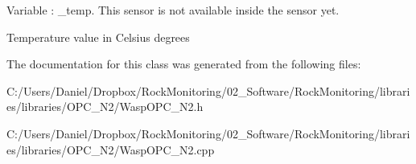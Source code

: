 Variable \+: \+\_\+temp. This sensor is not available inside the sensor yet. 

Temperature value in Celsius degrees 

The documentation for this class was generated from the following files\+:\begin{DoxyCompactItemize}
\item 
C\+:/\+Users/\+Daniel/\+Dropbox/\+Rock\+Monitoring/02\+\_\+\+Software/\+Rock\+Monitoring/libraries/libraries/\+O\+P\+C\+\_\+\+N2/Wasp\+O\+P\+C\+\_\+\+N2.\+h\item 
C\+:/\+Users/\+Daniel/\+Dropbox/\+Rock\+Monitoring/02\+\_\+\+Software/\+Rock\+Monitoring/libraries/libraries/\+O\+P\+C\+\_\+\+N2/Wasp\+O\+P\+C\+\_\+\+N2.\+cpp\end{DoxyCompactItemize}
